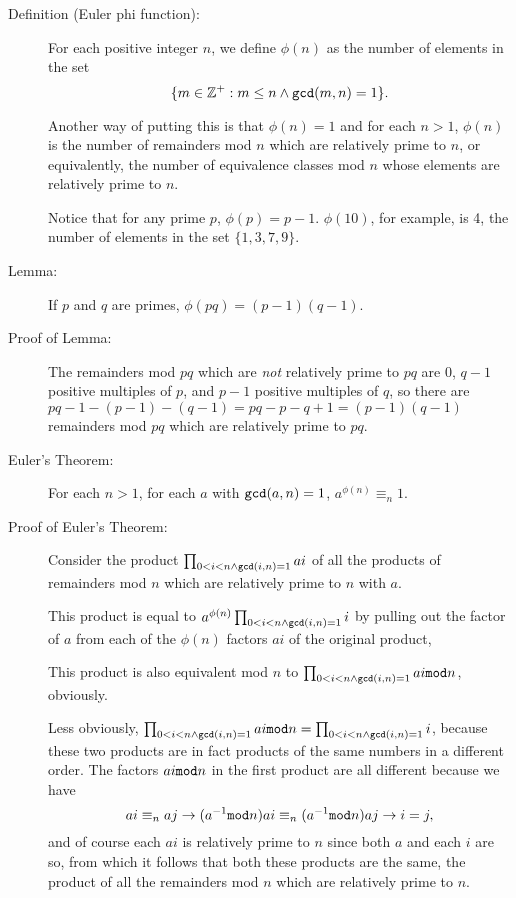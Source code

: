 \documentclass[12pt]{article}
\begin{document}
\begin{description}

\item[Definition (Euler phi function):]  For each positive integer $n$, we define $\phi(n)$ as the number of elements in the set $$\{m \in {\mathbb Z}^+:m \leq n \wedge {\tt gcd}(m,n) = 1\}.$$

Another way of putting this is that $\phi(n)=1$ and for each $n>1$, $\phi(n)$ is the number of remainders mod $n$ which are relatively prime to $n$, or equivalently, the number of equivalence classes mod $n$ whose elements are relatively prime to $n$.

Notice that for any prime $p$, $\phi(p) = p-1$.  $\phi(10)$, for example, is 4, the number of elements in the set $\{1,3,7,9\}$.

\item[Lemma:]  If $p$ and $q$ are primes, $\phi(pq) = (p-1)(q-1)$.

\item[Proof of Lemma:]  The remainders mod $pq$ which are {\em not\/} relatively prime to $pq$ are 0,
$q-1$ positive multiples of $p$, and $p-1$ positive multiples of $q$, so there are $pq-1-(p-1)-(q-1) = pq-p-q+1 = (p-1)(q-1)$ remainders mod $pq$ which are relatively prime to $pq$.

\item[Euler's Theorem:]  For each $n>1$, for each $a$ with ${\tt gcd}(a,n)=1$, $a^{\phi(n)} \equiv_n 1$.

\item[Proof of Euler's Theorem:]  Consider the product $\prod_{0<i<n \wedge {\tt gcd}(i,n)=1} ai$ of all the products of remainders mod $n$ which are relatively prime to $n$ with $a$.

This product is equal to $a^{\phi(n)}\prod_{0<i<n \wedge {\tt gcd}(i,n)=1} i$ by pulling out the factor of $a$ from each of the $\phi(n)$ factors $ai$ of the original product,

This product is also equivalent mod $n$ to  $\prod_{0<i<n \wedge {\tt gcd}(i,n)=1} ai{\tt mod}n$, obviously.

Less obviously, $\prod_{0<i<n \wedge {\tt gcd}(i,n)=1} ai{\tt mod}n = \prod_{0<i<n \wedge {\tt gcd}(i,n)=1} i$,
because these two products are in fact products of the same numbers in a different order.  The factors $ai{\tt mod}n$ in the first product are all different because we have $$ai \equiv_n aj \rightarrow (a^{-1}{\tt mod}n)ai \equiv_n (a^{-1}{\tt mod}n)aj \rightarrow i=j,$$ and of course each $ai$ is relatively prime to $n$ since both $a$ and each $i$ are so, from which it follows that both these products are the same, the product of all the remainders mod $n$ which are relatively prime to $n$.


\end{description}
\end{document}
